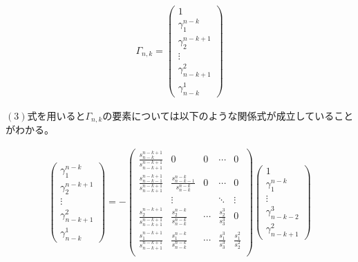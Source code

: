 \documentclass{jsarticle}
\begin{document}
\begin{align}
	\Gamma_{n, k} =
	\begin{pmatrix}
		1\\[8pt]
		\gamma_1^{n-k}\\[8pt]
		\gamma_2^{n-k+1}\\[8pt]
		\vdots\\[8pt]
		\gamma_{n-k+1}^2\\[8pt]
		\gamma_{n-k}^1
	\end{pmatrix}
\end{align}

$(3)$式を用いると$\Gamma_{n,k}$の要素については以下のような関係式が成立していることがわかる。

\begin{align}
	\begin{pmatrix}
		\gamma_1^{n-k}\\[8pt]
		\gamma_2^{n-k+1}\\[8pt]
		\vdots\\[8pt]
		\gamma_{n-k+1}^2\\[8pt]
		\gamma_{n-k}^1
	\end{pmatrix} = -
	\begin{pmatrix}
		\frac{s_{n-k}^{n-k+1}}{s_{n-k+1}^{n-k+1}} & 0 &0 &\cdots & 0\\[8pt]
		\frac{s_{n-k-1}^{n-k+1}}{s_{n-k+1}^{n-k+1}} & \frac{s_{n-k-1}^{n-k}}{s_{n-k}^{n-k}} & 0& \cdots & 0\\[8pt]
		 &\vdots && \ddots & \vdots\\[8pt]
		\frac{s_{2}^{n-k+1}}{s_{n-k+1}^{n-k+1}} & \frac{s_{2}^{n-k}}{s_{n-k}^{n-k}} & \cdots & \frac{s_2^3}{s_3^3} & 0\\[8pt]
		\frac{s_{1}^{n-k+1}}{s_{n-k+1}^{n-k+1}} & \frac{s_{1}^{n-k}}{s_{n-k}^{n-k}} & \cdots & \frac{s_1^3}{s_3^3} & \frac{s_1^2}{s_2^2}\\[8pt]
	\end{pmatrix}
	\begin{pmatrix}
		1\\[8pt]
		\gamma_1^{n-k}\\[8pt]
		\vdots\\[8pt]
		\gamma_{n-k-2}^{3}\\[8pt]
		\gamma_{n-k+1}^2
	\end{pmatrix}
\end{align}
\end{document}
